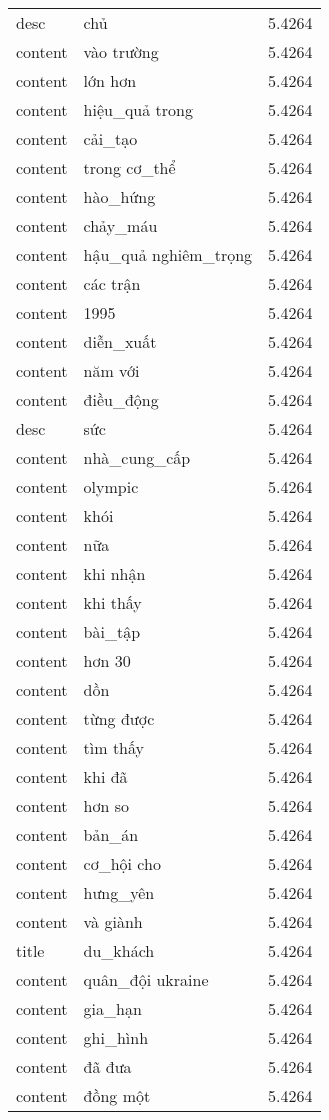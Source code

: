 \documentclass{article}
\begin{document}
\begin{tabular}{lll}
desc & chủ & 5.4264\\
content & vào trường & 5.4264\\
content & lớn hơn & 5.4264\\
content & hiệu\_quả trong & 5.4264\\
content & cải\_tạo & 5.4264\\
content & trong cơ\_thể & 5.4264\\
content & hào\_hứng & 5.4264\\
content & chảy\_máu & 5.4264\\
content & hậu\_quả nghiêm\_trọng & 5.4264\\
content & các trận & 5.4264\\
content & 1995 & 5.4264\\
content & diễn\_xuất & 5.4264\\
content & năm với & 5.4264\\
content & điều\_động & 5.4264\\
desc & sức & 5.4264\\
content & nhà\_cung\_cấp & 5.4264\\
content & olympic & 5.4264\\
content & khói & 5.4264\\
content & nữa & 5.4264\\
content & khi nhận & 5.4264\\
content & khi thấy & 5.4264\\
content & bài\_tập & 5.4264\\
content & hơn 30 & 5.4264\\
content & dồn & 5.4264\\
content & từng được & 5.4264\\
content & tìm thấy & 5.4264\\
content & khi đã & 5.4264\\
content & hơn so & 5.4264\\
content & bản\_án & 5.4264\\
content & cơ\_hội cho & 5.4264\\
content & hưng\_yên & 5.4264\\
content & và giành & 5.4264\\
title & du\_khách & 5.4264\\
content & quân\_đội ukraine & 5.4264\\
content & gia\_hạn & 5.4264\\
content & ghi\_hình & 5.4264\\
content & đã đưa & 5.4264\\
content & đồng một & 5.4264\\

\end{tabular}
\end{document}
